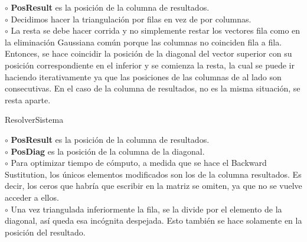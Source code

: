 \documentclass[double, 1.5in, 12pt]{beavtex}
\begin{document}
$\circ$ \textbf{PosResult} es la posici\'on de la columna de resultados. \\
$\circ$ Decidimos hacer la triangulaci\'on por filas en vez de por columnas. \\
$\circ$ La resta se debe hacer corrida y no simplemente restar los vectores fila como en la eliminaci\'on Gaussiana com\'un porque las columnas no coinciden fila a fila. Entonces, se hace coincidir la posici\'on de la diagonal del vector superior con su posici\'on correspondiente en el inferior y se comienza la resta, la cual se puede ir haciendo iterativamente ya que las posiciones de las columnas de al lado son consecutivas. En el caso de la columna de resultados, no es la misma situaci\'on, se resta aparte. \\



\IncMargin{1em}
\begin{algorithm}
\BlankLine

\caption{ResolverSistema}\label{algo_disjdecomp}
\end{algorithm}\DecMargin{1em}

$\circ$ \textbf{PosResult} es la posici\'on de la columna de resultados. \\
$\circ$ \textbf{PosDiag} es la posici\'on de la columna de la diagonal. \\
$\circ$ Para optimizar tiempo de c\'omputo, a medida que se hace el Backward Sustitution, los \'unicos elementos modificados son los de la columna resultados. Es decir, los ceros que habr\'ia que escribir en la matriz se omiten, ya que no se vuelve acceder a ellos. \\
$\circ$ Una vez triangulada inferiormente la fila, se la divide por el elemento de la diagonal, as\'i queda esa inc\'ognita despejada. Esto tambi\'en se hace solamente en la posici\'on del resultado.\\
\end{document}
